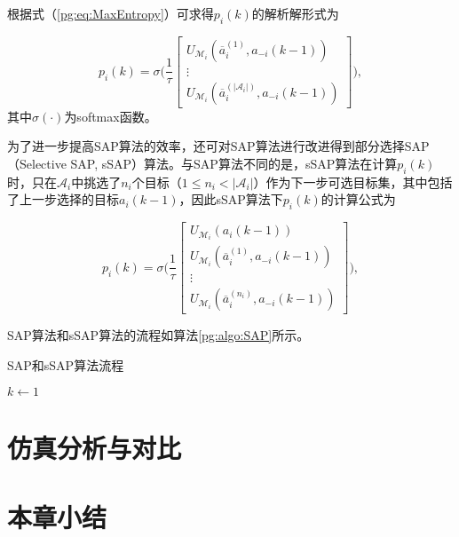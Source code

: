 根据式（\ref{pg:eq:MaxEntropy}）可求得$p_i(k)$的解析解形式为

\begin{equation}
\label{pg:eq:sappdf}
	p_i(k) = \sigma \Bigg(\frac{1}{\tau}\begin{bmatrix}
		U_{\mathcal{M}_i}(\overline a_i^{(1)},a_{-i}(k-1))\\ \vdots \\ U_{\mathcal{M}_i}(\overline a_i^{(|\mathcal{A}_i|)},a_{-i}(k-1))
	\end{bmatrix} \Bigg),
\end{equation}
其中$\sigma(\cdot)$为softmax函数。

为了进一步提高SAP算法的效率，还可对SAP算法进行改进得到部分选择SAP（Selective SAP, sSAP）算法。与SAP算法不同的是，sSAP算法在计算$p_i(k)$时，只在$\mathcal{A}_i$中挑选了$n_i$个目标（$1 \leq n_i < |\mathcal{A}_i|$）作为下一步可选目标集，其中包括了上一步选择的目标$a_i(k-1)$，因此sSAP算法下$p_i(k)$的计算公式为

\begin{equation}
\label{pg:eq:ssappdf}
	p_i(k) = \sigma \Bigg(\frac{1}{\tau}\begin{bmatrix}
		U_{\mathcal{M}_i}(a_i(k-1))\\ U_{\mathcal{M}_i}(\overline a_i^{(1)},a_{-i}(k-1))\\
	\vdots \\ U_{\mathcal{M}_i}(\overline a_i^{(n_i)},a_{-i}(k-1))
	\end{bmatrix} \Bigg),
\end{equation}

SAP算法和sSAP算法的流程如算法\ref{pg:algo:SAP}所示。

\begin{algorithm}[htb]
	\caption{SAP和sSAP算法流程}
	\label{pg:algo:SAP}
	\small
	\SetAlgoLined
	
	$k \gets 1$\;
\end{algorithm}




\section{仿真分析与对比}
\label{pg:simulation}



\section{本章小结}
\label{pg:conclusion}

















